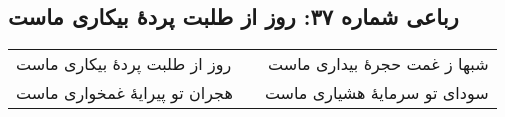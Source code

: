 \begin{center}
\section*{رباعی شماره ۳۷: روز از طلبت پردهٔ بیکاری ماست}
\label{sec:sh037}
\begin{longtable}{l p{0.5cm} r}
روز از طلبت پردهٔ بیکاری ماست
&&
شبها ز غمت حجرهٔ بیداری ماست
\\
هجران تو پیرایهٔ غمخواری ماست
&&
سودای تو سرمایهٔ هشیاری ماست
\\
\end{longtable}
\end{center}
